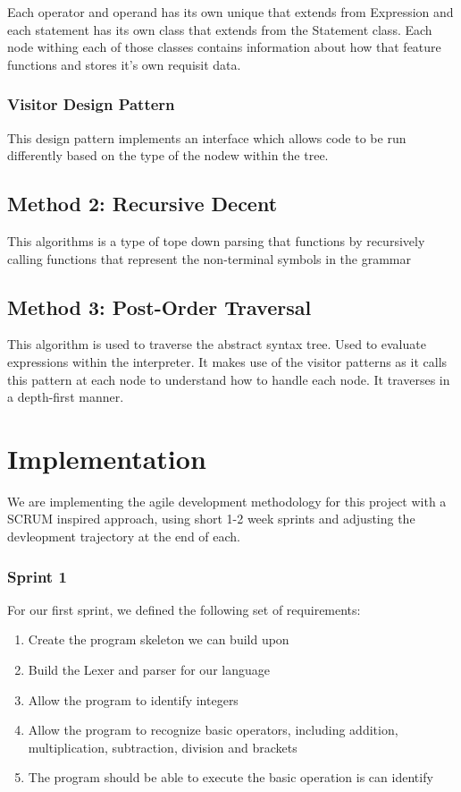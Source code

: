 \documentclass[a4paper, oneside, 11pt]{report}
\begin{document}
Each operator and operand has its own unique that extends from Expression and each
statement has its own class that extends from the Statement class. Each node withing
each of those classes contains information about how that feature functions and stores it’s
own requisit data.

\subsection{Visitor Design Pattern}

This design pattern implements an interface which allows code to be run differently based
on the type of the nodew within the tree.

\section{Method 2: Recursive Decent}

This algorithms is a type of tope down parsing that functions by recursively calling functions that represent the non-terminal symbols in the grammar

\section{Method 3: Post-Order Traversal}

This algorithm is used to traverse the abstract syntax tree. Used to evaluate expressions
within the interpreter. It makes use of the visitor patterns as it calls this pattern at each
node to understand how to handle each node. It traverses in a depth-first manner.



\chapter{Implementation}\label{Impl}

We are implementing the agile development methodology for this project with a SCRUM inspired approach, using short 1-2 week sprints and adjusting the devleopment trajectory at the end of each.

\subsection{Sprint 1}

For our first sprint, we defined the following set of requirements: 

\begin{enumerate}
\item Create the program skeleton we can build upon 
\item Build the Lexer and parser for our language 
\item Allow the program to identify integers 
\item Allow the program to recognize basic operators, including addition, multiplication, subtraction, division and brackets 
\item The program should be able to execute the basic operation is can identify 
\end{enumerate}
\end{document}
